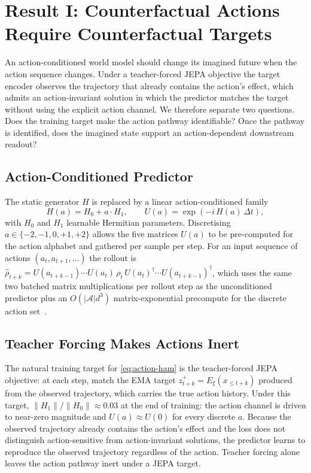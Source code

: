 \section{Result I: Counterfactual Actions Require Counterfactual Targets}
\label{sec:actions}

An action-conditioned world model should change its imagined future
when the action sequence changes. Under a teacher-forced JEPA objective
the target encoder observes the trajectory that already contains the
action's effect, which admits an action-invariant solution in which the
predictor matches the target without using the explicit action channel.
We therefore separate two questions. Does the training target make the
action pathway identifiable? Once the pathway is identified, does the
imagined state support an action-dependent downstream readout?

\subsection{Action-Conditioned Predictor}
\label{sec:action-predictor}

The static generator $H$ is replaced by a linear action-conditioned
family~\cite{horowitz2022quantum}
\begin{equation}
H(a) = H_0 + a \cdot H_1,
\qquad U(a) = \exp(-i\, H(a)\, \Delta t),
\label{eq:action-ham}
\end{equation}
with $H_0$ and $H_1$ learnable Hermitian parameters. Discretising
$a \in \{-2, -1, 0, +1, +2\}$ allows the five matrices $U(a)$ to be
pre-computed for the action alphabet and gathered per sample per step.
For an input sequence of actions $(a_t, a_{t+1}, \dots)$ the rollout is
$\hat\rho_{t+k} = U(a_{t+k-1}) \cdots U(a_t) \, \rho_t \, U(a_t)^\dagger
\cdots U(a_{t+k-1})^\dagger$, which uses the same two batched matrix
multiplications per rollout step as the unconditioned predictor plus
an $O(|\mathcal{A}|d^3)$ matrix-exponential precompute for the
discrete action set~\cite{oh2015action,watter2015e2c}.

\subsection{Teacher Forcing Makes Actions Inert}
\label{sec:teacher-forced}

The natural training target for \cref{eq:action-ham} is the
teacher-forced JEPA objective: at each step, match the EMA target
$z_{t+k}^+ = E_\xi(x_{\le t+k})$ produced from the observed trajectory,
which carries the true action history. Under this target,
$\|H_1\| / \|H_0\| \approx 0.03$ at the end of training: the action
channel is driven to near-zero magnitude and $U(a) \approx U(0)$ for
every discrete $a$. Because the observed trajectory already contains
the action's effect and the loss does not distinguish action-sensitive
from action-invariant solutions, the predictor learns to reproduce the
observed trajectory regardless of the action. Teacher forcing alone
leaves the action pathway inert under a JEPA target.

